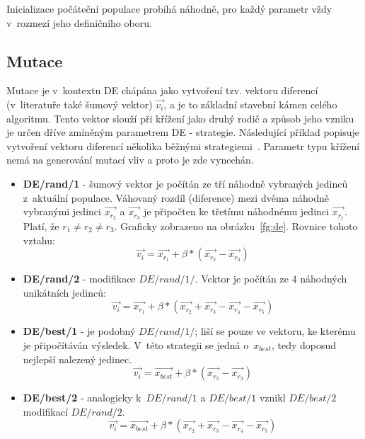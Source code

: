 Inicializace počáteční populace probíhá náhodně, pro každý parametr vždy v~rozmezí jeho definičního oboru.

\subsection{Mutace}
Mutace je v~kontextu DE chápána jako vytvoření tzv. vektoru diferencí (v~literatuře také šumový vektor) $\Vec{v_i}$, a je to základní stavební kámen celého algoritmu. Tento vektor slouží při křížení jako druhý rodič a způsob jeho vzniku je určen dříve zmíněným parametrem DE - strategie. Následující příklad popisuje vytvoření vektoru diferencí několika běžnými strategiemi~\cite{DE_IEEE, Weisser2010}. Parametr typu křížení nemá na generování mutací vliv a proto je zde vynechán.

\begin{itemize}
    \item \textbf{DE/rand/1} - šumový vektor je počítán ze tří náhodně vybraných jedinců z~aktuální populace. Váhovaný rozdíl (diference) mezi dvěma náhodně vybranými jedinci $\Vec{x_{r_2}}$ a $\Vec{x_{r_3}}$
    je připočten ke třetímu náhodnému jedinci $\Vec{x_{r_1}}$. Platí, že $r_1 \neq r_2 \neq r_3$. Graficky zobrazeno na obrázku~\ref{fg:de}. Rovnice tohoto vztahu:
    \begin{equation}
    \Vec{v_i} = \Vec{x_{r_1}} + \beta * (\Vec{x_{r_2}} - \Vec{x_{r_3}})
    \label{eq:de_rand_1}
    \end{equation} 

    \item \textbf{DE/rand/2} - modifikace $DE/rand/1/$. Vektor je počítán ze $4$ náhodných unikátních jedinců:
        \begin{equation}
    \Vec{v_i} = \Vec{x_{r_1}} + \beta * (\Vec{x_{r_2}} +\Vec{x_{r_3}} - \Vec{x_{r_4}} - \Vec{x_{r_5}})
    \label{eq:de_rand_2}
    \end{equation} 
    
    \item \textbf{DE/best/1} - je podobný $DE/rand/1/$; liší se pouze ve vektoru, ke kterému je připočítáván výsledek. V~této strategii se jedná o~$x_{best}$, tedy doposud nejlepší nalezený jedinec.
    \begin{equation}
    \Vec{v_i} = \Vec{x_{best}} + \beta * (\Vec{x_{r_2}} - \Vec{x_{r_3}})
    \label{eq:de_rand_1}
    \end{equation} 

    \item \textbf{DE/best/2} - analogicky k~$DE/rand/1$ a $DE/best/1$ vznikl $DE/best/2$ modifikací $DE/rand/2$.
    \begin{equation}
    \Vec{v_i} = \Vec{x_{best}} + \beta * (\Vec{x_{r_2}} +\Vec{x_{r_3}} - \Vec{x_{r_4}} - \Vec{x_{r_5}})
    \label{eq:de_rand_2}
    \end{equation} 
\end{itemize}

